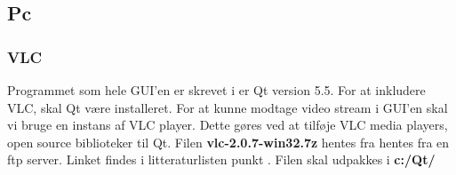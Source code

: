 \subsection{Pc}
\subsubsection{VLC}
Programmet som hele GUI'en er skrevet i er Qt version 5.5. For at inkludere VLC, skal Qt være installeret. For at kunne modtage video stream i GUI'en skal vi bruge en instans af VLC player. Dette gøres ved at tilføje VLC media players, open source biblioteker til Qt. Filen \textbf{vlc-2.0.7-win32.7z} hentes fra hentes fra en ftp server. Linket findes i litteraturlisten punkt \cite{lib:vlc-ftp}. Filen skal udpakkes i \textbf{c:/Qt/}